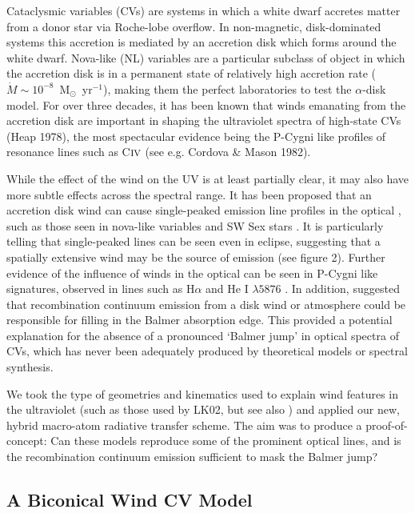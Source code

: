 \documentclass[useAMS,usenatbib,onecolumn]{mn2e2}
\begin{document}
Cataclysmic variables (CVs) are systems in which a white dwarf accretes matter from a donor
star via Roche-lobe overflow. In non-magnetic, disk-dominated systems this accretion
is mediated by an accretion disk which forms around the white dwarf. 
Nova-like (NL) variables are a particular subclass of object in which the accretion disk
is in a permanent state of relatively high accretion rate 
($\dot{M} \sim 10^{-8}$~M$_{\odot}$~yr$^{-1}$), making them the perfect laboratories to 
test the $\alpha$-disk model.
For over three decades, it has been known that winds emanating from the accretion disk
are important in shaping the ultraviolet spectra of high-state CVs (Heap 1978), 
the most spectacular evidence being the P-Cygni like profiles of resonance lines such as 
C${\textsc {iv}}$ (see e.g. Cordova \& Mason 1982\nocite{cordova1982}).

While the effect of the wind on the UV is at least partially clear, it may also have more subtle 
effects across the spectral range. It has been proposed that an accretion disk wind
can cause single-peaked emission line profiles in the optical \citep{MC96}, 
such as those seen in nova-like variables and SW Sex stars \citep{HSK86, DR95}.
It is particularly telling that single-peaked lines can be seen even in eclipse, suggesting 
that a spatially extensive wind may be the source of emission (see figure 2).
Further evidence of the influence of winds in the optical can be seen in P-Cygni like signatures,
observed in lines such as H$\alpha$ and He I $\lambda5876$ \citep{RN98}.
In addition, \cite{KLWB98} suggested
that recombination continuum emission from a disk wind or atmosphere
could be responsible for filling in the Balmer absorption edge. This provided
a potential explanation for
the absence of a pronounced `Balmer jump' in optical spectra of CVs, which has never been adequately produced 
by theoretical models or spectral synthesis.

We took the type of geometries and kinematics used to explain wind 
features in the ultraviolet 
(such as those used by LK02, but see also \citealt{SVM96, noebauer})
and applied our new, hybrid macro-atom radiative transfer scheme. 
The aim was to produce a proof-of-concept: Can these models reproduce some of the 
prominent optical lines, and is the recombination continuum emission
sufficient to mask the Balmer jump?

\subsection{A Biconical Wind CV Model}
\end{document}
